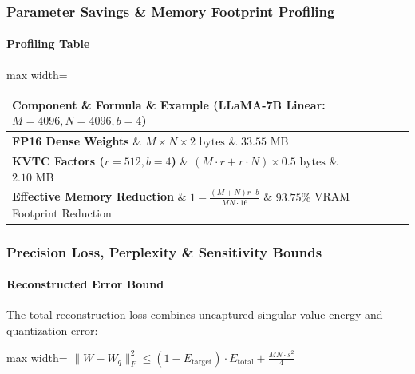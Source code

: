 \subsubsection*{Parameter Savings \& Memory Footprint Profiling}

\paragraph{Profiling Table}

\begin{center}
\begin{adjustbox}{max width=\columnwidth}
\renewcommand{\arraystretch}{1.2}
\begin{tabular}{lll}
\toprule
Component \& Formula \& Example (LLaMA-7B Linear: $M=4096, N=4096, b=4$) \\
\midrule
\textbf{FP16 Dense Weights} \& $M \times N \times 2 \text{ bytes}$ \& $33.55 \text{ MB}$ \\
\textbf{KVTC Factors ($r=512, b=4$)} \& $(M \cdot r + r \cdot N) \times 0.5 \text{ bytes}$ \& $2.10 \text{ MB}$ \\
\textbf{Effective Memory Reduction} \& $1 - \frac{(M+N) r \cdot b}{M N \cdot 16}$ \& $\mathbf{93.75\%}$ VRAM Footprint Reduction \\

\bottomrule
\end{tabular}
\end{adjustbox}
\end{center}

\subsubsection*{Precision Loss, Perplexity \& Sensitivity Bounds}

\paragraph{Reconstructed Error Bound}

The total reconstruction loss combines uncaptured singular value energy and quantization error:

\begin{center}
\begin{adjustbox}{max width=\columnwidth}
$\displaystyle
\| W - W_q \|_F^2 \le (1 - E_{\text{target}}) \cdot E_{\text{total}} + \frac{M N \cdot s^2}{4}
$
\end{adjustbox}
\end{center}

